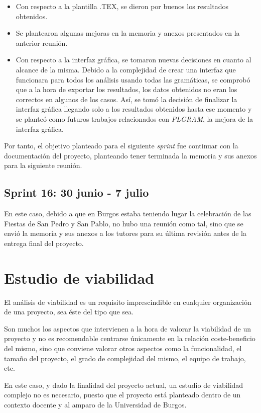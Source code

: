\begin{itemize}
\item Con respecto a la plantilla .TEX, se dieron por buenos los resultados obtenidos.
\item Se plantearon algunas mejoras en la memoria y anexos presentados en la anterior reunión.
\item Con respecto a la interfaz gráfica, se tomaron nuevas decisiones en cuanto al alcance de la misma. Debido a la complejidad de crear una interfaz que funcionara para todos los análisis usando todas las gramáticas, se comprobó que a la hora de exportar los resultados, los datos obtenidos no eran los correctos en algunos de los casos. Así, se tomó la decisión de finalizar la interfaz gráfica llegando solo a los resultados obtenidos hasta ese momento y se planteó como futuros trabajos relacionados con \textit{PLGRAM}, la mejora de la interfaz gráfica.
\end{itemize}

Por tanto, el objetivo planteado para el siguiente \textit{sprint} fue continuar con la documentación del proyecto, planteando tener terminada la memoria y sus anexos para la siguiente reunión.

\subsection{Sprint 16: 30 junio - 7 julio}

En este caso, debido a que en Burgos estaba teniendo lugar la celebración de las Fiestas de San Pedro y San Pablo, no hubo una reunión como tal, sino que se envió la memoria y sus anexos a los tutores para su última revisión antes de la entrega final del proyecto.

\section{Estudio de viabilidad}

El análisis de viabilidad es un requisito imprescindible en cualquier organización de una proyecto, sea éste del tipo que sea.

Son muchos los aspectos que intervienen a la hora de valorar la viabilidad de un proyecto y no es recomendable centrarse únicamente en la relación coste-beneficio del mismo, sino que conviene valorar otros aspectos como la funcionalidad, el tamaño del proyecto, el grado de complejidad del mismo, el equipo de trabajo, etc.

En este caso, y dado la finalidad del proyecto actual, un estudio de viabilidad complejo no es necesario, puesto que el proyecto está planteado dentro de un contexto docente y al amparo de la Universidad de Burgos. 

